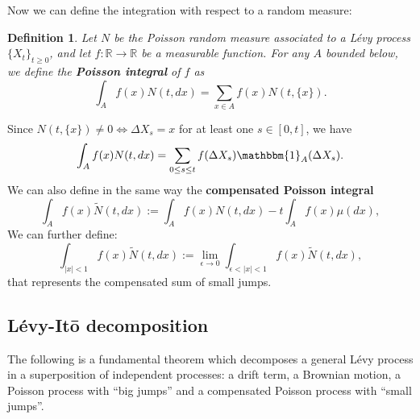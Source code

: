 \documentclass[a4paper,10pt]{article}
\newcommand{\numberset}{\mathbb}
\newcommand{\R}{\numberset{R}}
\newtheorem{Definition}{Definition}[section]
\begin{document}
\noindent
Now we can define the integration with respect to a random measure:
\begin{Definition} \label{Poisson_int}
 Let $N$ be the Poisson random measure associated to a Lévy process $\{X_t\}_{t \geq 0}$, and let $f:\R \to \R$ be a measurable
 function. For any $A$ bounded below, we define the \textbf{Poisson integral} of $f$ as
 \begin{equation}
  \int_A f(x) N(t,dx) = \sum_{x\in A} f(x) N(t,\{x\}). 
 \end{equation}
\end{Definition}
\noindent
Since $N(t,\{x\}) \neq 0 \Leftrightarrow \Delta X_s=x$ for at least one $s\in [0,t]$, we have  
 \begin{equation}
  \int_A f(x) N(t,dx) = \sum_{0 \leq s \leq t} f(\Delta X_s) \mathbbm{1}_A(\Delta X_s). 
 \end{equation}
We can also define in the same way the \textbf{compensated Poisson integral}
\begin{equation}
  \int_A f(x) \tilde{N}(t,dx) := \int_A f(x) N(t,dx) - t \int_A f(x) \mu(dx), 
\end{equation}
We can further define:
\begin{equation}
\int_{|x|<1} f(x) \tilde N(t,dx) := \lim_{\epsilon \to 0} \int_{\epsilon < |x| < 1} f(x) \tilde N(t,dx), 
\end{equation}
that represents the compensated sum of small jumps.

 
\subsection{Lévy-It\={o} decomposition}

The following is a fundamental theorem which decomposes a general Lévy process in a superposition 
of independent processes: a drift term, a Brownian motion, a Poisson process with ``big jumps'' and a compensated Poisson process with ``small jumps''.
\end{document}
